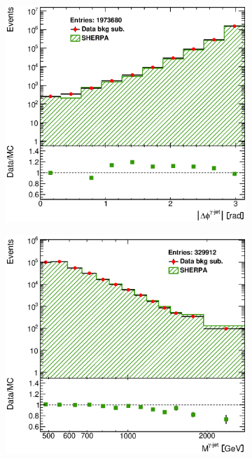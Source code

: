 \documentclass[12pt, twoside]{article}
\numberwithin{equation}{section}
\numberwithin{figure}{section}
\newenvironment{changemargin}[2]{%
\begin{list}{}{%
\setlength{\topsep}{0pt}%
\setlength{\leftmargin}{#1}%
\setlength{\rightmargin}{#2}%
\setlength{\listparindent}{\parindent}%
\setlength{\itemindent}{\parindent}%
\setlength{\parsep}{\parskip}%
}%
\item[]}{\end{list}}
\begin{document}
\begin{figure}
\begin{changemargin}{-1.0cm}{-0.75cm}
\begin{changemargin}{-0.75cm}{-1.0cm}
        \vspace{0.2cm}
        \begin{subfigure}[b]{0.37\textwidth}
            \includegraphics[width=\textwidth]{./images/BackgroundSubtractedSherpa/SIG_EVENTS-107.eps}
            \subcaption{}
            \label{fig:BSDeltaPhiPhotonJetSHERPA}
        \end{subfigure}
        \begin{subfigure}[b]{0.37\textwidth}
            \includegraphics[width=\textwidth]{./images/BackgroundSubtractedSherpa/SIG_EVENTS-108.eps}

\end{subfigure}
\end{changemargin}
\end{changemargin}
\end{figure}
\end{document}
